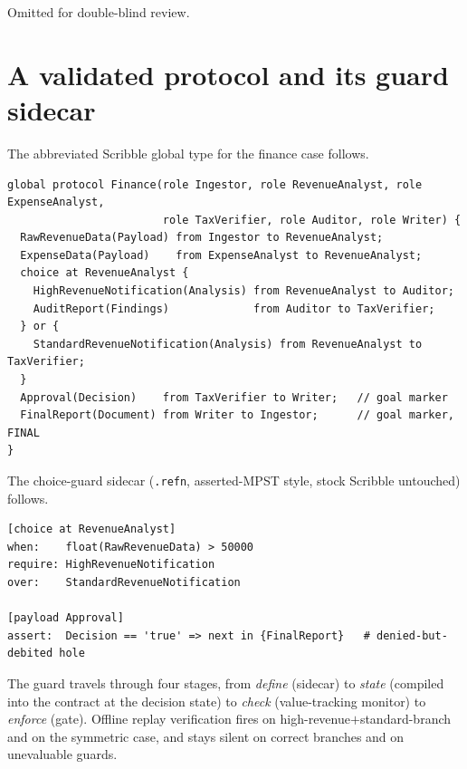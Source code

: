\documentclass{article}
\begin{document}
\begin{ack}
Omitted for double-blind review.
\end{ack}




\newpage
\appendix

\section{A validated protocol and its guard sidecar}\label{app:scr}
The abbreviated Scribble global type for the finance case follows.
\begin{small}
\begin{verbatim}
global protocol Finance(role Ingestor, role RevenueAnalyst, role ExpenseAnalyst,
                        role TaxVerifier, role Auditor, role Writer) {
  RawRevenueData(Payload) from Ingestor to RevenueAnalyst;
  ExpenseData(Payload)    from ExpenseAnalyst to RevenueAnalyst;
  choice at RevenueAnalyst {
    HighRevenueNotification(Analysis) from RevenueAnalyst to Auditor;
    AuditReport(Findings)             from Auditor to TaxVerifier;
  } or {
    StandardRevenueNotification(Analysis) from RevenueAnalyst to TaxVerifier;
  }
  Approval(Decision)    from TaxVerifier to Writer;   // goal marker
  FinalReport(Document) from Writer to Ingestor;      // goal marker, FINAL
}
\end{verbatim}
\end{small}
The choice-guard sidecar (\texttt{.refn}, asserted-MPST style, stock Scribble untouched) follows.
\begin{small}
\begin{verbatim}
[choice at RevenueAnalyst]
when:    float(RawRevenueData) > 50000
require: HighRevenueNotification
over:    StandardRevenueNotification

[payload Approval]
assert:  Decision == 'true' => next in {FinalReport}   # denied-but-debited hole
\end{verbatim}
\end{small}
The guard travels through four stages, from \emph{define} (sidecar) to \emph{state} (compiled into the contract at the decision state) to \emph{check} (value-tracking monitor) to \emph{enforce} (gate). Offline replay verification fires on high-revenue$+$standard-branch and on the symmetric case, and stays silent on correct branches and on unevaluable guards.
\end{document}
